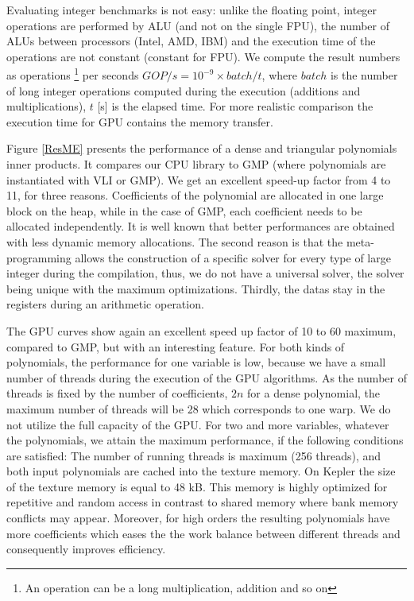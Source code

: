 \documentclass[oribibl]{llncs2e/llncs}
\begin{document}
Evaluating  integer benchmarks  is not easy: unlike the floating point, integer operations are performed by ALU (and not on the single FPU),  the number of  ALUs  between processors (Intel, AMD, IBM) and the execution time of the operations are  not constant \cite{ASMcost} (constant for FPU).  We compute the  result  numbers as operations \footnote{An operation can be a long multiplication, addition and so on}   per seconds $GOP/s=10^{-9} \times batch/t$, where  $batch$ is the number of long integer operations computed during the execution (additions and multiplications), $t$ [s]  is the elapsed time. For more realistic comparison the execution time for GPU contains the memory  transfer. 

Figure \ref{ResME} presents the performance of a dense and triangular polynomials inner products. It compares our CPU library to GMP (where polynomials are  instantiated with VLI or GMP). We get an excellent speed-up factor from 4 to 11, for three reasons.
Coefficients of the  polynomial are allocated in one large block on the heap, while in the case of GMP, each coefficient needs to be allocated independently. It is well known that better performances are obtained with less dynamic memory allocations. The second reason is that  the meta-programming allows the construction of a specific solver for every type of large integer during the compilation, thus, we do not have a universal solver, the solver being unique with the maximum optimizations. Thirdly, the datas stay in the registers during an arithmetic operation.
  
The GPU curves show again an excellent speed up  factor of 10 to 60 maximum, compared to GMP, but with an interesting feature. 
For both kinds of polynomials, the performance for one variable is low, because we have a small number of threads during the execution of the GPU algorithms.
As the number of threads is fixed by the number of coefficients, $2n$ for a dense polynomial,  the maximum number of threads will be 28
 which corresponds to one warp. We do not utilize the full capacity of the GPU. For two and more variables, whatever the polynomials, 
  we attain the maximum performance,  if the following conditions are satisfied: The number of running threads is maximum (256 threads), and both input
  polynomials  are cached into the texture memory. On Kepler the size of the texture memory is equal to 48 kB. This memory  is highly optimized for repetitive and random access in contrast to shared memory
 where bank memory conflicts may appear.
Moreover, for high orders the resulting polynomials have more coefficients which eases the the work balance between different threads and consequently improves efficiency.
 
\end{document}
